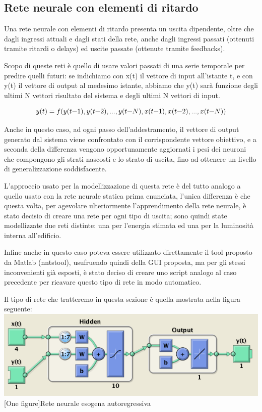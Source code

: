 \subsection{Rete neurale con elementi di ritardo}

Una rete neurale con elementi di ritardo presenta un uscita dipendente, oltre che dagli ingressi attuali e dagli stati della rete, anche dagli ingressi passati (ottenuti tramite ritardi o delays) ed uscite passate (ottenute tramite feedbacks).

Scopo di queste reti è quello di usare valori passati di una serie temporale per predire quelli futuri: se indichiamo con x(t) il vettore di input all’istante t, e con y(t) il vettore di output al medesimo istante, abbiamo che y(t) sarà funzione degli ultimi N vettori risultato del sistema e degli ultimi N vettori di input.

$$
y(t)=f(y(t\lyxmathsym{\textminus}1),y(t\lyxmathsym{\textminus}2),...,y(t\lyxmathsym{\textminus}N),x(t\lyxmathsym{\textminus}1),x(t\lyxmathsym{\textminus}2),...,x(t\lyxmathsym{\textminus}N))
$$

Anche in questo caso, ad ogni passo dell'addestramento, il vettore di output generato dal sistema viene confrontato con il corrispondente vettore obiettivo, e a seconda della differenza vengono opportunamente aggiornati i pesi dei neuroni che compongono gli strati nascosti e lo strato di uscita, fino ad ottenere un livello di generalizzazione soddisfacente.

L'approccio usato per la modellizzazione di questa rete è del tutto analogo a quello usato con la rete neurale statica prima enunciata, l'unica differenza è che questa volta, per agevolare ulteriormente l'apprendimento della rete neurale, è stato decisio di creare una rete per ogni tipo di uscita; sono quindi state modellizzate due reti distinte: una per l'energia stimata ed una per la luminosità interna all'edificio.

Infine anche in questo caso poteva essere utilizzato direttamente il tool proposto da Matlab (nntstool), usufruendo quindi della GUI proposta, ma per gli stessi inconvenienti già esposti, è stato deciso di creare uno script analogo al caso precedente per ricavare questo tipo di rete in modo automatico.

Il tipo di rete che tratteremo in questa sezione è quella mostrata nella figura seguente:\\

\vspace{20px}
\includegraphics[scale=0.5]{images/timeseries/energia/net.png}
[One figure]{Rete neurale esogena autoregressiva}
\vspace{20px}

